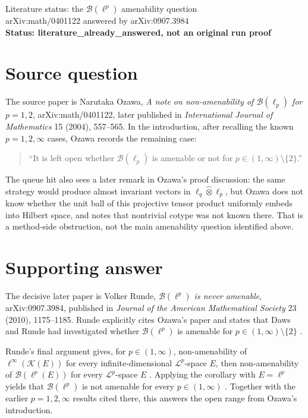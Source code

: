 \documentclass[11pt]{article}
\newcommand{\B}{\mathcal{B}}
\newcommand{\K}{\mathcal{K}}
\begin{document}
\begin{center}
{\Large Literature status: the $\B(\ell^p)$ amenability question}\\[0.4em]
{\large arXiv:math/0401122 answered by arXiv:0907.3984}\\[0.6em]
\textbf{Status: literature\_already\_answered, not an original run proof}
\end{center}

\section*{Source question}

The source paper is Narutaka Ozawa, \emph{A note on non-amenability of
$\B(\ell_p)$ for $p=1,2$}, arXiv:math/0401122, later published in
\emph{International Journal of Mathematics} 15 (2004), 557--565.
In the introduction, after recalling the known $p=1,2,\infty$ cases, Ozawa
records the remaining case:
\begin{quote}
``It is left open whether $\B(\ell_p)$ is amenable or not for
$p\in(1,\infty)\setminus\{2\}$.'' \cite[p.~1]{Ozawa2004}
\end{quote}

The queue hit also sees a later remark in Ozawa's proof discussion: the same
strategy would produce almost invariant vectors in
$\ell_q\widehat{\otimes}\ell_p$, but Ozawa does not know whether the unit ball
of this projective tensor product uniformly embeds into Hilbert space, and
notes that nontrivial cotype was not known there. That is a method-side
obstruction, not the main amenability question identified above.

\section*{Supporting answer}

The decisive later paper is Volker Runde, \emph{$\B(\ell^p)$ is never
amenable}, arXiv:0907.3984, published in \emph{Journal of the American
Mathematical Society} 23 (2010), 1175--1185. Runde explicitly cites Ozawa's
paper and states that Daws and Runde had investigated whether $\B(\ell^p)$ is
amenable for $p\in(1,\infty)\setminus\{2\}$ \cite[Introduction]{Runde2010}.

Runde's final argument gives, for $p\in(1,\infty)$, non-amenability of
$\ell^\infty(\K(E))$ for every infinite-dimensional $\mathcal L^p$-space
$E$, then non-amenability of $\B(\ell^p(E))$ for every $\mathcal L^p$-space
$E$ \cite[Proposition 4.1 and Theorem 4.2]{Runde2010}. Applying the corollary
with $E=\ell^p$ yields that $\B(\ell^p)$ is not amenable for every
$p\in(1,\infty)$ \cite[Corollary 4.3 and following paragraph]{Runde2010}.
Together with the earlier $p=1,2,\infty$ results cited there, this answers the
open range from Ozawa's introduction.
\end{document}
